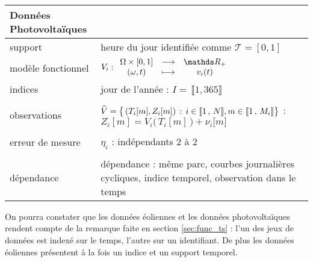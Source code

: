 \noalign\begin{tabularx}{\textwidth}{XX}
	\toprule
	\textbf{Données Photovoltaïques}                                                                                                                                                                                   \\
	\midrule
	support            & heure du jour identifiée comme $\mathcal T = [0,1]$                                                                                                                                                          \\
	modèle fonctionnel & ${V}_i : \func {\Omega \times [0,1]} {\mathds R_+} {(\omega, t)} {v_i(t)}$                                                                                                                    \\
	indices            & jour de l'année : $I = \, \llbracket 1, 365 \rrbracket$                                                                                                                        \\
	\\
	observations       & $\widehat V = \bigl\{ \, (T_i[m], Z_i[m]) \, : \, i \in \llbracket 1 \, , \, N \rrbracket, m \in \llbracket 1 \, , \, M_i \rrbracket \bigr\}$ : $Z_i[m] = V_i\bigl( \, T_i[m] \, \bigr) + \nu_i\bigl[ m \bigr]$ \\
	\\
	erreur de mesure   & $\eta_i$ : indépendants 2 à 2                                                                                                                                                                 \\
	\\
	dépendance         & dépendance : même parc, courbes journalières cycliques, indice temporel, observation dans le temps                                                                                                                                             \\
	\bottomrule
\end{tabularx}

\begin{rem}
	On pourra constater que les données éoliennes et les données photovoltaïques rendent compte de la remarque faite en section \ref{sec:func_ts} : l'un des jeux de données est indexé sur le temps, l'autre sur un identifiant. De plus les données éoliennes présentent à la fois un indice et un support temporel.
\end{rem}


